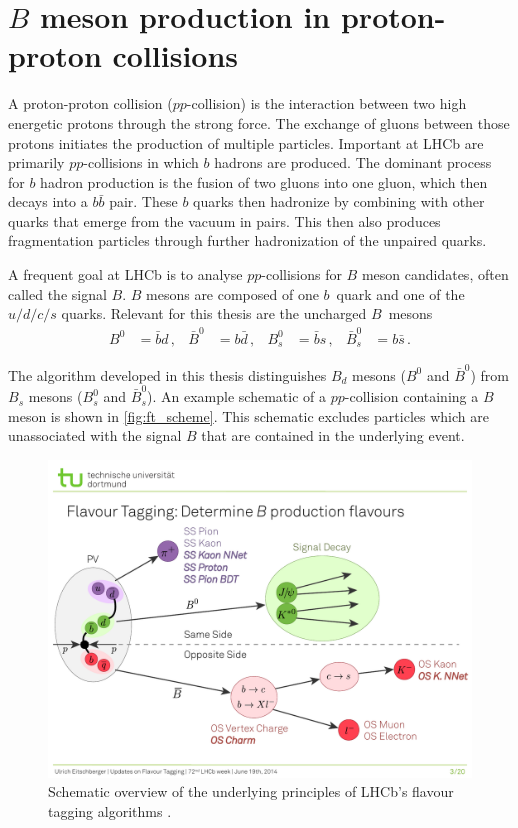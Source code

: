 \section{\texorpdfstring{$B$}{B} meson production in proton-proton collisions}
\label{sec:B_mesons}

A proton-proton collision ($pp$-collision) is the interaction between two high energetic protons through the strong force.
The exchange of gluons between those protons initiates the production of multiple particles. 
Important at LHCb are primarily $pp$-collisions in which $b$ hadrons are produced.
The dominant process for $b$ hadron production is the fusion of two gluons into one gluon, which then decays into a $b\bar{b}$ pair.
These $b$ quarks then hadronize by combining with other quarks that emerge from the vacuum in pairs.
This then also produces fragmentation particles through further hadronization of the unpaired quarks.

A frequent goal at LHCb is to analyse $pp$-collisions for $B$ meson candidates, often called the signal $B$.
$B$ mesons are composed of one $b$~quark and one of the $u/d/c/s$ quarks.
Relevant for this thesis are the uncharged $B$~mesons
\begin{align*}
    B^0 &= \bar{b}d \, , & \bar{B}^0 &= b\bar{d} \, , & B_s^0 &= \bar{b}s \, , & \bar{B}_s^0 &= b\bar{s} \, .
\end{align*}

The algorithm developed in this thesis distinguishes $B_d$ mesons ($B^0$ and $\bar{B}^0$) from $B_s$ mesons ($B_s^0$ and $\bar{B}_s^0$).
An example schematic of a $pp$-collision containing a $B$ meson is shown in \autoref{fig:ft_scheme}. 
This schematic excludes particles which are unassociated with the signal $B$ that are contained in the underlying event.

\begin{figure}
    \centering
    \includegraphics[width=\textwidth]{images/FlavourTaggingScheme.pdf}
    \caption{Schematic overview of the underlying principles of LHCb's flavour tagging algorithms \cite{ft_scheme}.}
    \label{fig:ft_scheme}
\end{figure}

